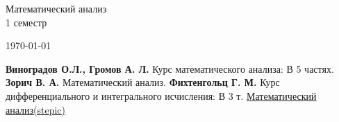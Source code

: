 \documentclass[14pt, a4paper]{article}
\theoremstyle{definition}
\theoremstyle{remark}
\begin{document}
\hfill \break
\hfill \break
\hfill \break
\hfill \break
\hfill \break
\hfill \break
\begin{center}
\Huge{Математический анализ} \\[2cm]
\LARGE{1 семестр} \\
\end{center}
\hfill \break
\begin{center} \today \end{center}
\thispagestyle{empty}
\newpage
\tableofcontents
\thispagestyle{empty}
\newpage
{}



\begin{thebibliography}{2}
 \textbf{Виноградов О.Л., Громов А. Л.} Курс математического анализа: В 5 частях.
 \textbf{Зорич В. А.} Математический анализ.
 \textbf{Фихтенгольц Г. М.} Курс дифференциального и интегрального исчисления: В 3 т.
 \href{https://stepik.org/course/716/info}{Математический анализ(stepic)}
\end{thebibliography}
\end{document}
